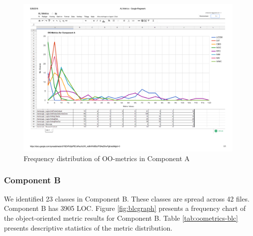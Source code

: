 \begin{landscape}
\setlength\LTleft{-.5in}
	\begin{figure}
	\label{fig:algraph}
	\caption{Frequency distribution of OO-metrics in Component A}
	\centering
	\includegraphics[width=\textwidth]{images/al.pdf}
	\end{figure}
\end{landscape}





\subsubsection{Component B}
We identified 23 classes in Component B. These classes are spread across 42 files. Component B has 3905 LOC. Figure \ref{fig:blcgraph} presents a frequency chart of the object-oriented metric results for Component B. Table \ref{tab:oometrics-blc} presents descriptive statistics of the metric distribution.


